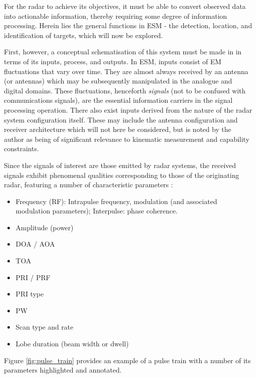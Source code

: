 

For the radar to achieve its objectives, it must be able to convert observed data into actionable information, thereby requiring some degree of information processing. 
Herein lies the general functions in \ac{ESM} - the detection, location, and identification of targets, which will now be explored. %

First, however, a conceptual schematisation of this system must be made in in terms of its inputs, process, and outputs. In \ac{ESM}, inputs consist of EM fluctuations that vary over time. They are almost always received by an antenna (or antennas) which may be subsequently manipulated in the analogue and digital domains. These fluctuations, henceforth \textit{signals} (not to be confused with communications signals), are the essential information carriers in the signal processing operation. There also exist inputs derived from the nature of the radar system configuration itself. These may include the antenna configuration and receiver architecture which will not here be considered, but is noted by the author as being of significant relevance to kinematic measurement and capability constraints.

Since the signals of interest are those emitted by radar systems, the received signals exhibit phenomenal qualities corresponding to those of the originating radar, featuring a number of characteristic parameters \cite[sect. 5-8.1]{avionics_department_electronic_2013}: 
\begin{itemize}
    \item Frequency (\ac{RF}): Intrapulse frequency, modulation (and associated modulation parameters); Interpulse: phase coherence.
    \item Amplitude (power)
    \item \ac{DOA} / \ac{AOA}
    \item \ac{TOA}
    \item \ac{PRI} / \ac{PRF}
    \item \ac{PRI} type
    \item \ac{PW}
    \item Scan type and rate
    \item Lobe duration (beam width or dwell)
\end{itemize}

Figure \ref{fig:pulse_train} provides an example of a pulse train with a number of its parameters highlighted and annotated.


